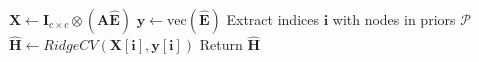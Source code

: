


\begin{algorithm}[t]
${\boldsymbol X} \leftarrow {\boldsymbol I}_{c \times c} \otimes ({\boldsymbol A}\hat{{\boldsymbol E}})$\textcolor{blue}{}
${\boldsymbol y} \leftarrow \text{vec}{(\hat{{\boldsymbol E}})}$\textcolor{blue}{}
Extract indices ${\boldsymbol i}$ with nodes in priors $\mathcal{P}$\;
$\hat{{\boldsymbol H}} \leftarrow RidgeCV({\boldsymbol X}[{\boldsymbol i}], {\boldsymbol y}[{\boldsymbol i}])$\;
Return $\hat{\boldsymbol H}$\;
\caption{\methodest \label{algo:cmest}}
\end{algorithm}
